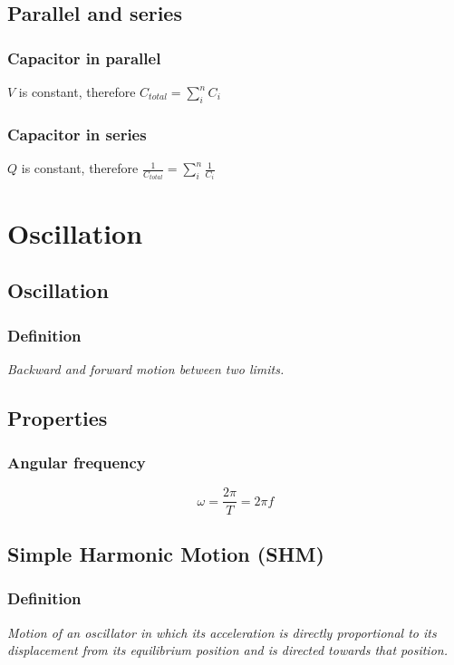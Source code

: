 \documentclass[a4paper,9pt]{scrartcl}
\begin{document}
    \subsection{Parallel and series}

    \subsubsection{Capacitor in parallel}

    $V$ is constant, therefore $C_{total} = \sum_{i}^{n} {C_i}$

    \subsubsection{Capacitor in series}

    $Q$ is constant, therefore $\frac{1}{C_{total}} = \sum_{i}^{n} {\frac{1}{C_i}}$


    \section{Oscillation}

    \subsection{Oscillation}

    \subsubsection{Definition}
    \textit{Backward and forward motion between two limits.}

    \subsection{Properties}

    \subsubsection{Angular frequency}
    \begin{displaymath}
        \omega = \frac{2\pi}{T} = 2{\pi}f
    \end{displaymath}

    \subsection{Simple Harmonic Motion (SHM)}

    \subsubsection{Definition}
    \textit{Motion of an oscillator in which its acceleration is directly proportional to its displacement from its equilibrium position and is directed towards that position.}
\end{document}
